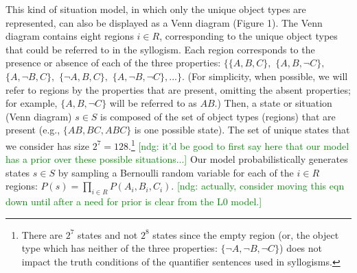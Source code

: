 \documentclass[floatsintext, doc]{apa6}
\newcommand{\ndg}[1]{{\textcolor{Green}{[ndg: #1]}}}
\begin{document}
This kind of situation model, in which only the unique object types are represented, can also be displayed as a Venn diagram (Figure 1).
The Venn diagram contains eight regions $i \in R$, corresponding to the unique object types that could be referred to in the syllogism. 
Each region corresponds to the presence or absence of each of the three properties: $\{\{A,B,C\},$ $\{A,B,\neg C\},$ $\{A,\neg B,C\},$ $\{\neg A, B, C\},$ $\{A, \neg B, \neg C\},...\}$. (For simplicity, when possible, we will refer to regions by the properties that are present, omitting the absent properties; for example, $\{A, B, \neg C\}$ will be referred to as $AB$.)
Then, a state or situation (Venn diagram) $s \in S$ is composed of the set of object types (regions) that are present (e.g., $\{AB, BC, ABC\}$ is one possible state).
The set of unique states that we consider has size $2^7 = 128$.\footnote{
There are $2^7$ states and not $2^8$ states since the empty region (or, the object type which has neither of the three properties: $\{\neg A, \neg B, \neg C\}$) does not impact the truth conditions of the quantifier sentences used in syllogisms.
}
\ndg{it'd be good to first say here that our model has a prior over these possible situations...}
Our model probabilistically generates states $s \in S$ by sampling a Bernoulli random variable for each of the $i \in R$ regions: $P(s) = \prod_{i \in R} P(A_{i}, B_{i}, C_{i})$. %
\ndg{actually, consider moving this eqn down until after a need for prior is clear from the L0 model.}
\end{document}
